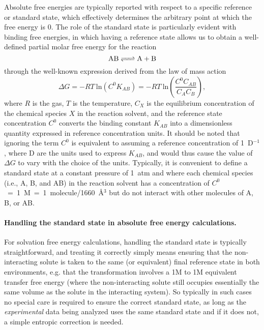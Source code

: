 \documentclass[9pt,bestpractices]{livecoms}
\begin{document}
Absolute free energies are typically reported with respect to a specific reference or standard state, which effectively determines the arbitrary point at which the free energy is 0.
The role of the standard state is particularly evident with binding free energies, in which having a reference state allows us to obtain a well-defined partial molar free energy for the reaction
\begin{equation*}
\ce{AB <=> A + B}
\end{equation*}
through the well-known expression derived from the law of mass action
\begin{equation} \label{eq:DGfromKAB}
\Delta G = -RT ~ \text{ln} \left( C^0 K_{AB} \right)  = -RT ~ \text{ln}\left( \frac{C^0 C_{AB}}{C_A C_B} \right) ,
\end{equation}
where $R$ is the gas, $T$ is the temperature, $C_X$ is the equilibrium concentration of the chemical species $X$ in the reaction solvent, and the reference state concentration $C^0$ converts the binding constant $K_{AB}$ into a dimensionless quantity expressed in reference concentration units.
It should be noted that ignoring the term $C^0$ is equivalent to assuming a reference concentration of 1~D$^{-1}$, where D are the units used to express $K_{AB}$, and would thus cause the value of $\Delta G$ to vary with the choice of the units.
Typically, it is convenient to define a standard state at a constant pressure of 1~atm and where each chemical species (i.e., A, B, and AB) in the reaction solvent has a concentration of $C^0$~=~1~M~=~1~molecule/1660~\r{A}$^3$ but do not interact with other molecules of A, B, or AB.

\paragraph{Handling the standard state in absolute free energy calculations.}

For solvation free energy calculations, handling the standard state is typically straightforward, and treating it correctly simply means ensuring that the non-interacting solute is taken to the same (or equivalent) final reference state in both environments, e.g. that the transformation involves a 1M to 1M equivalent transfer free energy (where the non-interacting solute still occupies essentially the same volume as the solute in the interacting system).
So typically in such cases no special care is required to ensure the correct standard state, as long as the \emph{experimental} data being analyzed uses the same standard state and if it does not, a simple entropic correction is needed.
\end{document}

